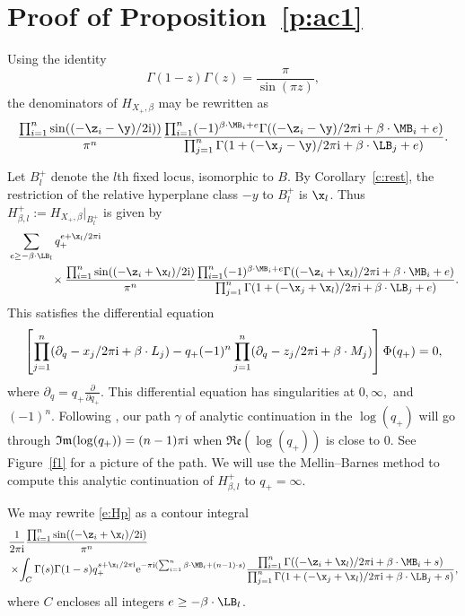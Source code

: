 \section{Proof of Proposition~\ref{p:ac1}}\label{appendix}

Using the identity
\begin{equation}\label{e:Gamma}\Gamma(1-z) \Gamma(z) = \frac{\pi}{\sin(\pi z)},\end{equation}
 the denominators of $H_{X_{+}, \beta}$ may be rewritten as
\[
\frac{ \prod_{i=1}^n \sin( (-\z_i -\y)/2 {\rm i}) )}{\pi^n}
\frac{\prod_{i=1}^n (-1)^{\beta \cdot \MB_i + e}\Gamma((-\z_i - \y)/2 \pi {\rm i} + \beta \cdot \MB_i + e)}
{\prod_{j=1}^n \Gamma(1 + (- \x_j - \y)/2 \pi {\rm i} + \beta \cdot \LB_j+e) }.
\]


Let $B_l^{+}$ denote the $l$th fixed locus, isomorphic to $B$. By Corollary~\ref{c:rest}, the restriction of the relative hyperplane class $-y$ to $B_l^{+}$ is $ \x_l$. Thus $H_{\beta,l}^{+} :=H_{X_{+}, \beta}|_{B_l^{+}}$ is given by
\begin{align}
&\sum_{e \geq -\beta \cdot \LB_l} q_+^{e+ \x_l/2 \pi {\rm i}}\nonumber\\
&\hphantom{\sum_{e \geq -\beta \cdot \LB_l}}{}\times\frac{ \prod_{i=1}^n \sin( (-\z_i+\x_l)/2 {\rm i}) }{\pi^n}\frac{\prod_{i=1}^n (-1)^{\beta \cdot \MB_i + e}\Gamma((-\z_i+\x_l)/2 \pi {\rm i} + \beta \cdot \MB_i + e)}
{\prod_{j=1}^n \Gamma(1 + (- \x_j+\x_l)/2 \pi {\rm i} + \beta \cdot \LB_j+e) }.\label{e:Hp}
\end{align}
This satisfies the differential equation
\[
\left[\prod_{j=1}^n (\partial_q -x_j/2 \pi {\rm i} + \beta \cdot L_j) - q_+(-1)^n\prod_{j=1}^n (\partial_q -z_j/2 \pi {\rm i} + \beta \cdot M_j) \right] \Phi(q_+) = 0,
\]
where $\partial_q = q_{+} \frac{\partial}{\partial q_{+}}$. This differential equation has singularities at $0, \infty,$ and $(-1)^n$. Following \cite{CIJ}, our path $\gamma$ of analytic continuation in the $\log(q_{+})$ will go through $\mathfrak{Im}(\log(q_{+})) = (n-1)\pi {\rm i}$ when $\mathfrak{Re}(\log(q_{+}))$ is close to 0. See Figure~\ref{f1} for a picture of the path.
We will use the Mellin--Barnes method to compute this analytic continuation of $H_{\beta,l}^{+}$ to $q_+ = \infty$.

We may rewrite \eqref{e:Hp} as a contour integral
\begin{align} \label{e:cint}&\frac{1}{2 \pi {\rm i}}\frac{ \prod_{i=1}^n \sin( (-\z_i+\x_l)/2 {\rm i}) }{\pi^n} \\
&\times\! \int_C \Gamma( s) \Gamma(1 - s) q_+^{s + \x_l/2 \pi {\rm i}} {\rm e}^{ -\pi {\rm i} (\sum_{i=1}^n \beta \cdot \MB_i+(n-1)\cdot s)} \frac{ \prod_{i=1}^n \Gamma((-\z_i+\x_l)/2 \pi {\rm i} + \beta \cdot \MB_i + s)}
{\prod_{j=1}^n \Gamma(1 + (- \x_j+\x_l)/2 \pi {\rm i} + \beta \cdot \LB_j+s) },
\nonumber \end{align}
where $C$ encloses all integers $e \geq -\beta \cdot \LB_l$.

